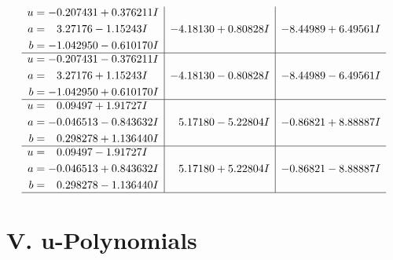 \documentclass[1p]{elsarticle_modified}
\theoremstyle{definition}
\begin{document}
$$\begin{array}{c|c|c}
\begin{aligned}
u &= -0.207431 + 0.376211 I \\
a &= \phantom{-}3.27176 - 1.15243 I \\
b &= -1.042950 - 0.610170 I\end{aligned}
 & -4.18130 + 0.80828 I & -8.44989 + 6.49561 I \\ \hline\begin{aligned}
u &= -0.207431 - 0.376211 I \\
a &= \phantom{-}3.27176 + 1.15243 I \\
b &= -1.042950 + 0.610170 I\end{aligned}
 & -4.18130 - 0.80828 I & -8.44989 - 6.49561 I \\ \hline\begin{aligned}
u &= \phantom{-}0.09497 + 1.91727 I \\
a &= -0.046513 - 0.843632 I \\
b &= \phantom{-}0.298278 + 1.136440 I\end{aligned}
 & \phantom{-}5.17180 - 5.22804 I & -0.86821 + 8.88887 I \\ \hline\begin{aligned}
u &= \phantom{-}0.09497 - 1.91727 I \\
a &= -0.046513 + 0.843632 I \\
b &= \phantom{-}0.298278 - 1.136440 I\end{aligned}
 & \phantom{-}5.17180 + 5.22804 I & -0.86821 - 8.88887 I\\
 \hline 
 \end{array}$$\newpage
\newpage\renewcommand{\arraystretch}{1}
\centering \section*{ V. u-Polynomials}
\end{document}
